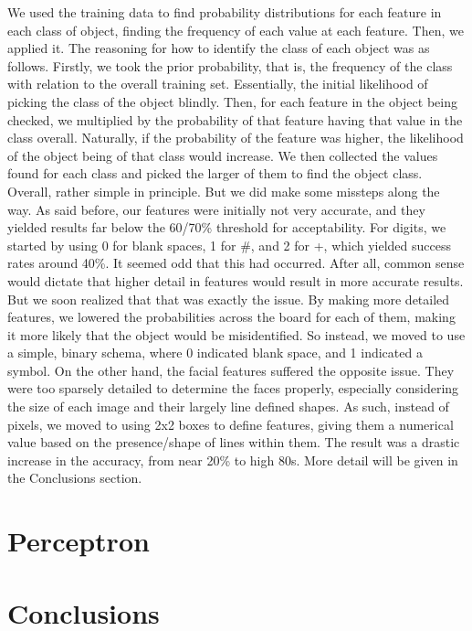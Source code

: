 \documentclass{article}
\begin{document}
We used the training data to find probability distributions for each feature in each class of object, finding the frequency of each value at each feature. Then, we applied it. The reasoning for how to identify the class of each object was as follows. Firstly, we took the prior probability, that is, the frequency of the class with relation to the overall training set. Essentially, the initial likelihood of picking the class of the object blindly. Then, for each feature in the object being checked, we multiplied by the probability of that feature having that value in the class overall. Naturally, if the probability of the feature was higher, the likelihood of the object being of that class would increase. We then collected the values found for each class and picked the larger of them to find the object class.
Overall, rather simple in principle. But we did make some missteps along the way. As said before, our features were initially not very accurate, and they yielded results far below the 60/70\% threshold for acceptability. For digits, we started by using 0 for blank spaces, 1 for #, and 2 for +, which yielded success rates around 40\%. It seemed odd that this had occurred. After all, common sense would dictate that higher detail in features would result in more accurate results. But we soon realized that that was exactly the issue. By making more detailed features, we lowered the probabilities across the board for each of them, making it more likely that the object would be misidentified. So instead, we moved to use a simple, binary schema, where 0 indicated blank space, and 1 indicated a symbol.
On the other hand, the facial features suffered the opposite issue. They were too sparsely detailed to determine the faces properly, especially considering the size of each image and their largely line defined shapes. As such, instead of pixels, we moved to using 2x2 boxes to define features, giving them a numerical value based on the presence/shape of lines within them. The result was a drastic increase in the accuracy, from near 20\% to high 80s. More detail will be given in the Conclusions section.  
\section{Perceptron}

\section{Conclusions}
\end{document}
